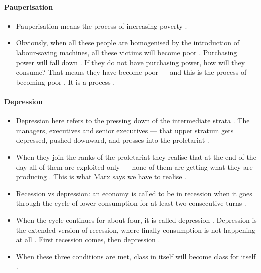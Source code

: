 \paragraph{Pauperisation}
\begin{itemize}
    \item Pauperisation means the process of increasing poverty .
    \item Obviously, when all these people are homogenised by the introduction of labour-saving machines, all these victims will become poor . Purchasing power will fall down . If they do not have purchasing power, how will they consume? That means they have become poor --- and this is the process of becoming poor . It is a process .
\end{itemize}

\paragraph{Depression}
\begin{itemize}
    \item Depression here refers to the pressing down of the intermediate strata . The managers, executives and senior executives --- that upper stratum gets depressed, pushed downward, and presses into the proletariat .
    \item When they join the ranks of the proletariat they realise that at the end of the day all of them are exploited only --- none of them are getting what they are producing . This is what Marx says we have to realise .
\end{itemize}

\begin{ComparisonBox}
\begin{itemize}
    \item Recession vs depression: an economy is called to be in recession when it goes through the cycle of lower consumption for at least two consecutive turns .
    \item When the cycle continues for about four, it is called depression . Depression is the extended version of recession, where finally consumption is not happening at all . First recession comes, then depression .
\end{itemize}
\end{ComparisonBox}

\begin{itemize}
    \item When these three conditions are met, class in itself will become class for itself .
\end{itemize}

